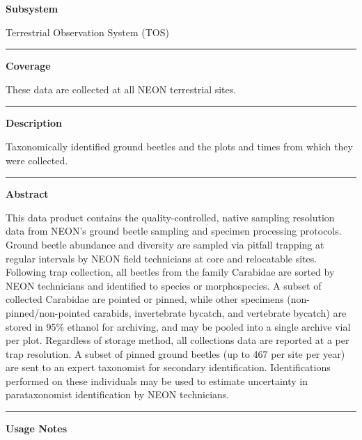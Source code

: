 \documentclass[]{article}
\begin{document}
\textbf{Subsystem}

Terrestrial Observation System (TOS)

\begin{center}\rule{0.5\linewidth}{\linethickness}\end{center}

\textbf{Coverage}

These data are collected at all NEON terrestrial sites.

\begin{center}\rule{0.5\linewidth}{\linethickness}\end{center}

\textbf{Description}

Taxonomically identified ground beetles and the plots and times from
which they were collected.

\begin{center}\rule{0.5\linewidth}{\linethickness}\end{center}

\textbf{Abstract}

This data product contains the quality-controlled, native sampling
resolution data from NEON's ground beetle sampling and specimen
processing protocols. Ground beetle abundance and diversity are sampled
via pitfall trapping at regular intervals by NEON field technicians at
core and relocatable sites. Following trap collection, all beetles from
the family Carabidae are sorted by NEON technicians and identified to
species or morphospecies. A subset of collected Carabidae are pointed or
pinned, while other specimens (non-pinned/non-pointed carabids,
invertebrate bycatch, and vertebrate bycatch) are stored in 95\% ethanol
for archiving, and may be pooled into a single archive vial per plot.
Regardless of storage method, all collections data are reported at a per
trap resolution. A subset of pinned ground beetles (up to 467 per site
per year) are sent to an expert taxonomist for secondary identification.
Identifications performed on these individuals may be used to estimate
uncertainty in parataxonomist identification by NEON technicians.

\begin{center}\rule{0.5\linewidth}{\linethickness}\end{center}

\textbf{Usage Notes}
\end{document}
